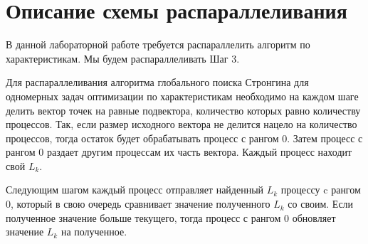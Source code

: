 \documentclass{report}
\begin{document}
\section*{Описание схемы распараллеливания}
В данной лабораторной работе требуется распараллелить алгоритм по характеристикам. Мы будем распараллеливать Шаг 3.
\par Для распараллеливания алгоритма глобального поиска Стронгина для одномерных задач оптимизации по характеристикам необходимо на каждом шаге делить вектор точек на равные подвектора, количество которых равно количеству процессов. Так, если размер исходного вектора не делится нацело на количество процессов, тогда остаток будет обрабатывать процесс с рангом 0. Затем процесс с рангом 0 раздает другим процессам их часть вектора. Каждый процесс находит свой $L_{k}$.
\par Следующим шагом каждый процесс отправляет найденный $L_{k}$ процессу c рангом 0, который в свою очередь сравнивает значение полученного $L_{k}$ со своим. Если полученное значение больше текущего, тогда процесс с рангом 0 обновляет значение $L_{k}$ на полученное.
\newpage

\end{document}
